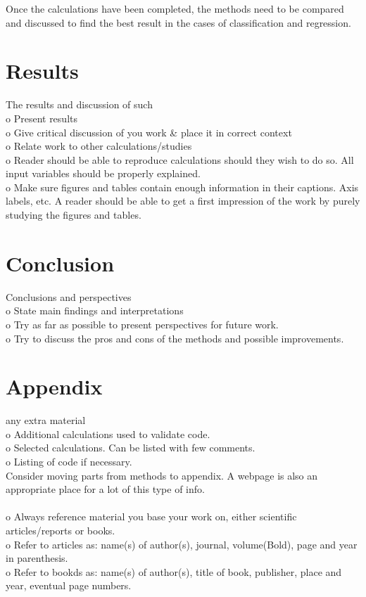 \documentclass[12pt, a4paper]{scrartcl}
\begin{document}
    Once the calculations have been completed, the methods need to be compared and discussed to 
find the best result in the cases of classification and regression. 


\section{Results}
    The results and discussion of such\\
    o   Present results \\
    o   Give critical discussion of you work \& place it in correct context\\
    o   Relate work to other calculations/studies\\
    o   Reader should be able to reproduce calculations should they wish to do so. 
        All input variables should be properly explained. \\
    o   Make sure figures and tables contain enough information in their captions. 
        Axis labels, etc. A reader should be able to get a first impression of the work
        by purely studying the figures and tables. \\
\section{Conclusion}
    Conclusions and perspectives\\
    o   State main findings and interpretations \\
    o   Try as far as possible to present perspectives for future work. \\
    o   Try to discuss the pros and cons of the methods and possible improvements. \\
\section{Appendix}
    any extra material \\
    o   Additional calculations used to validate code. \\
    o   Selected calculations. Can be listed with few comments. \\
    o   Listing of code if necessary. \\
    Consider moving parts from methods to appendix. A webpage is also an appropriate place
    for a lot of this type of info. \\\\

    o   Always reference material you base your work on, either scientific articles/reports
        or books. \\
    o   Refer to articles as: name(s) of author(s), journal, volume(Bold), page and year in
        parenthesis. \\
    o   Refer to bookds as: name(s) of author(s), title of book, publisher, place and year, 
        eventual page numbers. \\


\end{document}
